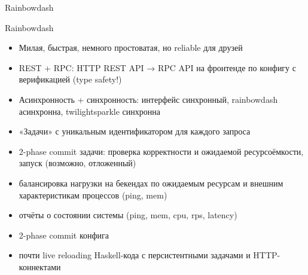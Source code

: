 \documentclass[10pt]{beamer}
\begin{document}
\begin{frame}
  \begin{center}
    \Large
    Rainbowdash
  \end{center}
\end{frame}

\begin{frame}[plain]
\end{frame}

\begin{frame}{Rainbowdash}
  \begin{itemize}
    \item Милая, быстрая, немного простоватая, но reliable для друзей
    \item REST + RPC: HTTP REST API → RPC API на фронтенде по конфигу с верификацией (type safety!)
    \item Асинхронность + синхронность: интерфейс синхронный, rainbowdash асинхронна, twilightsparkle синхронна
    \item «Задачи» с уникальным идентификатором для каждого запроса
    \item 2-phase commit задачи: проверка корректности и ожидаемой ресурсоёмкости, запуск (возможно, отложенный)
    \item балансировка нагрузки на бекендах по ожидаемым ресурсам и внешним характеристикам процессов (ping, mem)
    \item отчёты о состоянии системы (ping, mem, cpu, rps, latency)
    \item 2-phase commit конфига
    \item почти live reloading Haskell-кода с персистентными задачами и HTTP-коннектами
  \end{itemize}
\end{frame}
\end{document}
